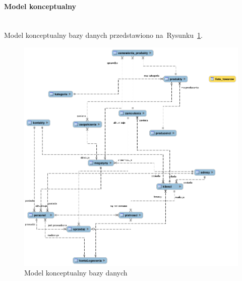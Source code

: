 \documentclass[a4paper, 12pt]{article}
\begin{document}
\paragraph{Model konceptualny} \mbox{}\\
Model konceptualny bazy danych przedstawiono na~Rysunku~\ref{fig:modelKonceptualny}.
\begin{figure}[H]
	\includegraphics[width=14cm]{modelKonceptualny.png}
	\caption[Model konceptualny bazy danych]{Model konceptualny bazy danych}
	\label{fig:modelKonceptualny}
\end{figure}
\end{document}
